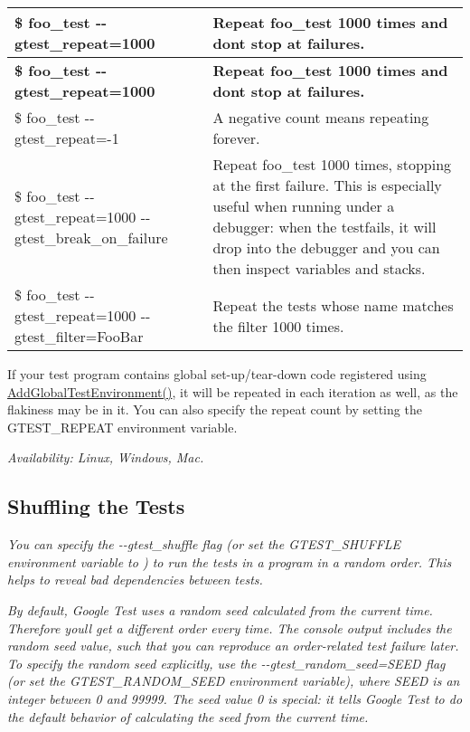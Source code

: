 {\itshape \tabulinesep=1mm
\begin{longtabu} spread 0pt [c]{*{2}{|X[-1]}|}
\hline
\rowcolor{\tableheadbgcolor}\textbf{ {\ttfamily \$ foo\+\_\+test -\/-\/gtest\+\_\+repeat=1000} }&\textbf{ Repeat foo\+\_\+test 1000 times and don\textquotesingle{}t stop at failures.  }\\
\endfirsthead
\hline
\endfoot
\hline
\rowcolor{\tableheadbgcolor}\textbf{ {\ttfamily \$ foo\+\_\+test -\/-\/gtest\+\_\+repeat=1000} }&\textbf{ Repeat foo\+\_\+test 1000 times and don\textquotesingle{}t stop at failures.  }\\
\endhead
{\ttfamily \$ foo\+\_\+test -\/-\/gtest\+\_\+repeat=-\/1} &A negative count means repeating forever. \\
{\ttfamily \$ foo\+\_\+test -\/-\/gtest\+\_\+repeat=1000 -\/-\/gtest\+\_\+break\+\_\+on\+\_\+failure} &Repeat foo\+\_\+test 1000 times, stopping at the first failure. This is especially useful when running under a debugger\+: when the testfails, it will drop into the debugger and you can then inspect variables and stacks. \\
{\ttfamily \$ foo\+\_\+test -\/-\/gtest\+\_\+repeat=1000 -\/-\/gtest\+\_\+filter=Foo\+Bar} &Repeat the tests whose name matches the filter 1000 times. \\
\end{longtabu}
If your test program contains global set-\/up/tear-\/down code registered using {\ttfamily \hyperlink{namespacetesting_a460d7b998622e332392c1e00be3a60d5}{Add\+Global\+Test\+Environment()}}, it will be repeated in each iteration as well, as the flakiness may be in it. You can also specify the repeat count by setting the {\ttfamily G\+T\+E\+S\+T\+\_\+\+R\+E\+P\+E\+AT} environment variable.}

{\itshape {\itshape Availability\+:} Linux, Windows, Mac.}

{\itshape \subsection*{Shuffling the Tests}}

{\itshape }

{\itshape You can specify the {\ttfamily -\/-\/gtest\+\_\+shuffle} flag (or set the {\ttfamily G\+T\+E\+S\+T\+\_\+\+S\+H\+U\+F\+F\+LE} environment variable to {}) to run the tests in a program in a random order. This helps to reveal bad dependencies between tests.}

{\itshape By default, Google Test uses a random seed calculated from the current time. Therefore you\textquotesingle{}ll get a different order every time. The console output includes the random seed value, such that you can reproduce an order-\/related test failure later. To specify the random seed explicitly, use the {\ttfamily -\/-\/gtest\+\_\+random\+\_\+seed=S\+E\+ED} flag (or set the {\ttfamily G\+T\+E\+S\+T\+\_\+\+R\+A\+N\+D\+O\+M\+\_\+\+S\+E\+ED} environment variable), where {\ttfamily S\+E\+ED} is an integer between 0 and 99999. The seed value 0 is special\+: it tells Google Test to do the default behavior of calculating the seed from the current time.}

